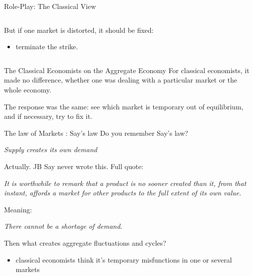 \begin{frame}{Role-Play: The Classical View}
\begin{columns}[T]
\begin{column}{0.4\textwidth}

But if one market is distorted, it should be fixed:

\begin{itemize}
\tightlist
\item
  terminate the strike.
\end{itemize}
\end{column}
\end{columns}
\end{frame}

\begin{frame}{The Classical Economists on the Aggregate Economy}
\protect\hypertarget{the-classical-economists-on-the-aggregate-economy}{}
For classical economists, it made no difference, whether one was dealing
with a particular market or the whole economy.

The response was the same: see which market is temporary out of
equilibrium, and if necessary, try to fix it.
\end{frame}

\begin{frame}{The law of Markets : Say's law}
\protect\hypertarget{the-law-of-markets-says-law}{}
Do you remember Say's law?

\pause

\emph{Supply creates its own demand}

\pause

Actually. JB Say never wrote this. Full quote:

\emph{It is worthwhile to remark that a product is no sooner created
than it, from that instant, affords a market for other products to the
full extent of its own value.}

\pause

Meaning:

\pause

\emph{There cannot be a shortage of demand}.

Then what creates aggregate fluctuations and cycles?

\begin{itemize}
\tightlist
\item
  classical economists think it's temporary misfunctions in one or
  several markets
\end{itemize}
\end{frame}

